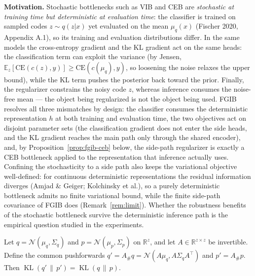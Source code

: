 \textbf{Motivation.}
Stochastic bottlenecks such as VIB and CEB are \emph{stochastic at training time but
deterministic at evaluation time}: the classifier is trained on sampled codes
$z \sim q(z|x)$ yet evaluated on the mean $\mu_q(x)$ (Fischer 2020, Appendix A.1), so
its training and evaluation distributions differ. In the same models the cross-entropy
gradient and the KL gradient act on the same heads: the classification term can exploit
the variance (by Jensen, $\mathbb{E}_z[\mathrm{CE}(c(z), y)] \ge \mathrm{CE}(c(\mu_q),
y)$, so loosening the noise relaxes the upper bound), while the KL term pushes the
posterior back toward the prior. Finally, the regularizer constrains the noisy code $z$,
whereas inference consumes the noise-free mean --- the object being regularized is not
the object being used. FGIB resolves all three mismatches by design: the classifier
consumes the deterministic representation $h$ at both training and evaluation time, the
two objectives act on disjoint parameter sets (the classification gradient does not
enter the side heads, and the KL gradient reaches the main path only through the shared
encoder), and, by Proposition~\ref{prop:fgib-ceb} below, the side-path regularizer is
exactly a CEB bottleneck applied to the representation that inference actually uses.
Confining the stochasticity to a side path also keeps the variational objective
well-defined: for continuous deterministic representations the residual information
diverges (Amjad \& Geiger; Kolchinsky et al.), so a purely deterministic bottleneck
admits no finite variational bound, while the finite side-path covariance of FGIB does
(Remark~\ref{rem:limit}). Whether the robustness benefits of the stochastic bottleneck
survive the deterministic inference path is the empirical question studied in the
experiments.

\begin{lemma}\label{lem:kl-invariance}
Let $q = \mathcal{N}(\mu_q, \Sigma_q)$ and $p = \mathcal{N}(\mu_p, \Sigma_p)$ on
$\mathbb{R}^{z}$, and let $A \in \mathbb{R}^{z \times z}$ be invertible. Define the
common pushforwards $q' = A_\# q = \mathcal{N}(A\mu_q, A\Sigma_q A^\top)$ and
$p' = A_\# p$. Then $\operatorname{KL}(q'\,\|\,p') = \operatorname{KL}(q\,\|\,p)$.
\end{lemma}

